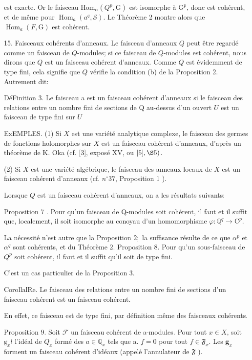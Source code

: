 est exacte. Or le faisceau $\mathrm{Hom}_{\alpha}\left(Q^{p}, \mathrm{G}\right)$ est isomorphe à $\mathrm{G}^{p}$, donc est cohérent, et de même pour $\operatorname{Hom}_{a}\left(a^{q}, \mathcal{S}\right)$. Le Théorème 2 montre alors que $\operatorname{Hom}_{a}(F, \mathrm{G})$ est cohérent.

15. Faisceaux cohérents d'anneaux. Le faisceau d'anneaux $Q$ peut être regardé comme un faisceau de $Q$-modules; si ce faisceau de $Q$-modules est cohérent, nous dirons que $Q$ est un faisceau cohérent d'anneaux. Comme $Q$ est évidemment de type fini, cela signifie que $Q$ vérifie la condition (b) de la Proposition 2. Autrement dit:

DéFinition 3. Le faisceau a est un faisceau cohérent d'anneaux si le faisceau des relations entre un nombre fini de sections de Q au-dessus d'un ouvert $U$ est un faisceau de type fini sur $U$

ExEMPLES. (1) Si $X$ est une variété analytique complexe, le faisceau des germes de fonctions holomorphes sur $X$ est un faisceau cohérent d'anneaux, d'après un théorème de K. Oka (cf. [3], exposé XV, ou $[5], \S 5)$.

(2) Si $X$ est une variété algébrique, le faisceau des anneaux locaux de $X$ est un faisceau cohérent d'anneaux (cf. $n^{\circ} 37$, Proposition 1 ).

Lorsque $Q$ est un faisceau cohérent d'anneaux, on a les résultats suivants:

Proposition 7 . Pour qu'un faisceau de Q-modules soit cohérent, il faut et il suffit que, localement, il soit isomorphe au conoyau d'un homomorphisme $\varphi: \mathbb{Q}^{q} \rightarrow \mathrm{C}^{p}$.

La nécessité n'est autre que la Proposition $2 ;$ la suffisance résulte de ce que $\alpha^{p}$ et $\alpha^{q}$ sont cohérents, et du Théorème $2 .$ Proposition 8. Pour qu'un sous-faisceau de $Q^{p}$ soit cohérent, il faut et il suffit qu'il soit de type fini.

C'est un cas particulier de la Proposition $3 .$

CorollalRe. Le faisceau des relations entre un nombre fini de sections d'un faisceau cohérent est un faisceau cohérent.

En effet, ce faisceau est de type fini, par définition même des faisceaux cohérents.

Proposition 9. Soit $\mathcal{F}$ un faisceau cohérent de a-modules. Pour tout $x \in X$, soit $\mathrm{g}_{x} l$ l'idéal de $Q_{x}$ formé des $a \in \mathbb{Q}_{x}$ tels que a. $f=0$ pour tout $f \in \mathfrak{F}_{x} .$ Les $\boldsymbol{g}_{x}$ forment un faisceau cohérent d'idéaux (appelé l'annulateur de $\mathfrak{F}$ ).

